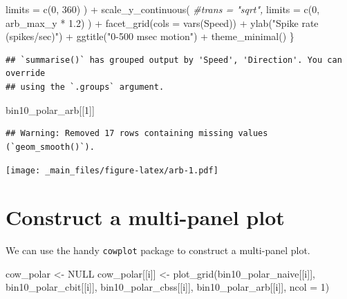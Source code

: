 \documentclass[
]{book}
\newenvironment{Shaded}{\begin{snugshade}}{\end{snugshade}}
\newcommand{\AttributeTok}[1]{\textcolor[rgb]{0.77,0.63,0.00}{#1}}
\newcommand{\CommentTok}[1]{\textcolor[rgb]{0.56,0.35,0.01}{\textit{#1}}}
\newcommand{\ConstantTok}[1]{\textcolor[rgb]{0.00,0.00,0.00}{#1}}
\newcommand{\DecValTok}[1]{\textcolor[rgb]{0.00,0.00,0.81}{#1}}
\newcommand{\FloatTok}[1]{\textcolor[rgb]{0.00,0.00,0.81}{#1}}
\newcommand{\FunctionTok}[1]{\textcolor[rgb]{0.00,0.00,0.00}{#1}}
\newcommand{\NormalTok}[1]{#1}
\newcommand{\OtherTok}[1]{\textcolor[rgb]{0.56,0.35,0.01}{#1}}
\newcommand{\SpecialCharTok}[1]{\textcolor[rgb]{0.00,0.00,0.00}{#1}}
\newcommand{\StringTok}[1]{\textcolor[rgb]{0.31,0.60,0.02}{#1}}
\begin{document}
\begin{Shaded}
\begin{Highlighting}[]
      \AttributeTok{limits =} \FunctionTok{c}\NormalTok{(}\DecValTok{0}\NormalTok{, }\DecValTok{360}\NormalTok{)}
\NormalTok{    ) }\SpecialCharTok{+}
    \FunctionTok{scale\_y\_continuous}\NormalTok{(}
      \CommentTok{\#trans = "sqrt",}
      \AttributeTok{limits =} \FunctionTok{c}\NormalTok{(}\DecValTok{0}\NormalTok{, arb\_max\_y }\SpecialCharTok{*} \FloatTok{1.2}\NormalTok{)}
\NormalTok{    ) }\SpecialCharTok{+}
    \FunctionTok{facet\_grid}\NormalTok{(}\AttributeTok{cols =} \FunctionTok{vars}\NormalTok{(Speed)) }\SpecialCharTok{+}
    \FunctionTok{ylab}\NormalTok{(}\StringTok{"Spike rate (spikes/sec)"}\NormalTok{) }\SpecialCharTok{+}
    \FunctionTok{ggtitle}\NormalTok{(}\StringTok{"0{-}500 msec motion"}\NormalTok{) }\SpecialCharTok{+}
    \FunctionTok{theme\_minimal}\NormalTok{()}
\NormalTok{\}}
\end{Highlighting}
\end{Shaded}

\begin{verbatim}
## `summarise()` has grouped output by 'Speed', 'Direction'. You can override
## using the `.groups` argument.
\end{verbatim}

\begin{Shaded}
\begin{Highlighting}[]
\NormalTok{bin10\_polar\_arb[[}\DecValTok{1}\NormalTok{]] }
\end{Highlighting}
\end{Shaded}

\begin{verbatim}
## Warning: Removed 17 rows containing missing values (`geom_smooth()`).
\end{verbatim}

\texttt{[image: \_main\_files/figure-latex/arb-1.pdf]}

\hypertarget{construct-a-multi-panel-plot}{%
\section{Construct a multi-panel plot}\label{construct-a-multi-panel-plot}}

We can use the handy \texttt{cowplot} package to construct a multi-panel plot.

\begin{Shaded}
\begin{Highlighting}[]
\NormalTok{cow\_polar }\OtherTok{\textless{}{-}} \ConstantTok{NULL}
\NormalTok{cow\_polar[[i]] }\OtherTok{\textless{}{-}}
  \FunctionTok{plot\_grid}\NormalTok{(bin10\_polar\_naive[[i]],}
\NormalTok{            bin10\_polar\_cbit[[i]],}
\NormalTok{            bin10\_polar\_cbss[[i]],}
\NormalTok{            bin10\_polar\_arb[[i]],}
            \AttributeTok{ncol =} \DecValTok{1}\NormalTok{)}
\end{Highlighting}
\end{Shaded}
\end{document}
